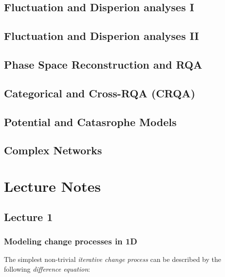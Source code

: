 \documentclass[]{book}
\let\stdsection\section
\renewcommand\section{\newpage\stdsection}
\begin{document}
\chapter{Fluctuation and Disperion analyses I}\label{fda1}

\chapter{Fluctuation and Disperion analyses II}\label{fda2}

\chapter{Phase Space Reconstruction and RQA}\label{RQA}

\chapter{Categorical and Cross-RQA (CRQA)}\label{CRQA}

\chapter{Potential and Catasrophe Models}\label{cusp}

\chapter{Complex Networks}\label{nets}

\part{Lecture Notes}\label{part-lecture-notes}

\chapter*{Lecture 1}\label{lecture-1}

\section*{Modeling change processes in
1D}\label{modeling-change-processes-in-1d}

The simplest non-trivial \emph{iterative change process} can be
described by the following \emph{difference equation}:
\end{document}
